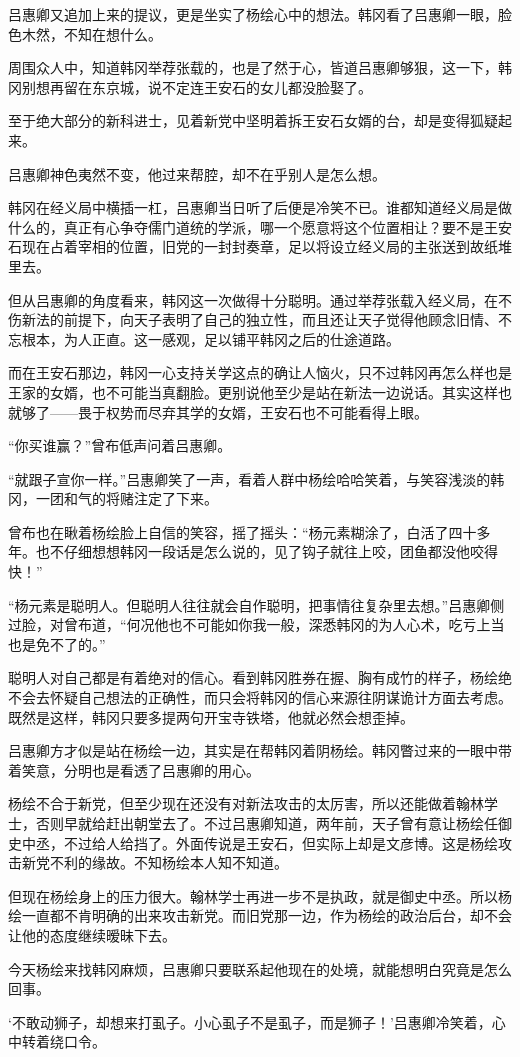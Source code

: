 吕惠卿又追加上来的提议，更是坐实了杨绘心中的想法。韩冈看了吕惠卿一眼，脸色木然，不知在想什么。

周围众人中，知道韩冈举荐张载的，也是了然于心，皆道吕惠卿够狠，这一下，韩冈别想再留在东京城，说不定连王安石的女儿都没脸娶了。

至于绝大部分的新科进士，见着新党中坚明着拆王安石女婿的台，却是变得狐疑起来。

吕惠卿神色夷然不变，他过来帮腔，却不在乎别人是怎么想。

韩冈在经义局中横插一杠，吕惠卿当日听了后便是冷笑不已。谁都知道经义局是做什么的，真正有心争夺儒门道统的学派，哪一个愿意将这个位置相让？要不是王安石现在占着宰相的位置，旧党的一封封奏章，足以将设立经义局的主张送到故纸堆里去。

但从吕惠卿的角度看来，韩冈这一次做得十分聪明。通过举荐张载入经义局，在不伤新法的前提下，向天子表明了自己的独立性，而且还让天子觉得他顾念旧情、不忘根本，为人正直。这一感观，足以铺平韩冈之后的仕途道路。

而在王安石那边，韩冈一心支持关学这点的确让人恼火，只不过韩冈再怎么样也是王家的女婿，也不可能当真翻脸。更别说他至少是站在新法一边说话。其实这样也就够了——畏于权势而尽弃其学的女婿，王安石也不可能看得上眼。

“你买谁赢？”曾布低声问着吕惠卿。

“就跟子宣你一样。”吕惠卿笑了一声，看着人群中杨绘哈哈笑着，与笑容浅淡的韩冈，一团和气的将赌注定了下来。

曾布也在瞅着杨绘脸上自信的笑容，摇了摇头：“杨元素糊涂了，白活了四十多年。也不仔细想想韩冈一段话是怎么说的，见了钩子就往上咬，团鱼都没他咬得快！”

“杨元素是聪明人。但聪明人往往就会自作聪明，把事情往复杂里去想。”吕惠卿侧过脸，对曾布道，“何况他也不可能如你我一般，深悉韩冈的为人心术，吃亏上当也是免不了的。”

聪明人对自己都是有着绝对的信心。看到韩冈胜券在握、胸有成竹的样子，杨绘绝不会去怀疑自己想法的正确性，而只会将韩冈的信心来源往阴谋诡计方面去考虑。既然是这样，韩冈只要多提两句开宝寺铁塔，他就必然会想歪掉。

吕惠卿方才似是站在杨绘一边，其实是在帮韩冈着阴杨绘。韩冈瞥过来的一眼中带着笑意，分明也是看透了吕惠卿的用心。

杨绘不合于新党，但至少现在还没有对新法攻击的太厉害，所以还能做着翰林学士，否则早就给赶出朝堂去了。不过吕惠卿知道，两年前，天子曾有意让杨绘任御史中丞，不过给人给挡了。外面传说是王安石，但实际上却是文彦博。这是杨绘攻击新党不利的缘故。不知杨绘本人知不知道。

但现在杨绘身上的压力很大。翰林学士再进一步不是执政，就是御史中丞。所以杨绘一直都不肯明确的出来攻击新党。而旧党那一边，作为杨绘的政治后台，却不会让他的态度继续暧昧下去。

今天杨绘来找韩冈麻烦，吕惠卿只要联系起他现在的处境，就能想明白究竟是怎么回事。

‘不敢动狮子，却想来打虱子。小心虱子不是虱子，而是狮子！’吕惠卿冷笑着，心中转着绕口令。

